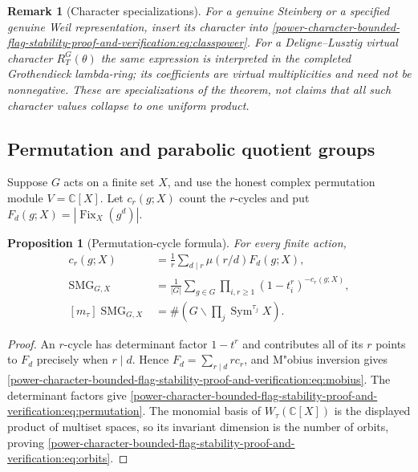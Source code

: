 \documentclass[10pt]{article}
\newcommand{\Sym}{\operatorname{Sym}}
\newcommand{\Fix}{\operatorname{Fix}}
\newcommand{\SMG}{\operatorname{SMG}}
\newcommand{\MGF}{\SMG}
\newcommand{\C}{\mathbb C}
\newtheorem{proposition}{Proposition}
\newtheorem{remark}{Remark}
\begin{document}
\begin{remark}[Character specializations]
For a genuine Steinberg or a specified genuine Weil representation, insert
its character into \eqref{power-character-bounded-flag-stability-proof-and-verification:eq:classpower}.  For a Deligne--Lusztig virtual
character $R_T^G(\theta)$ the same expression is interpreted in the completed
Grothendieck lambda-ring; its coefficients are virtual multiplicities and
need not be nonnegative.  These are specializations of the theorem, not
claims that all such character values collapse to one uniform product.
\end{remark}

\subsection{Permutation and parabolic quotient groups}

Suppose $G$ acts on a finite set $X$, and use the honest complex permutation
module $V=\C[X]$.  Let $c_r(g;X)$ count the $r$-cycles and put
$F_d(g;X)=|\Fix_X(g^d)|$.

\begin{proposition}[Permutation-cycle formula]\label{power-character-bounded-flag-stability-proof-and-verification:prop:permutation}
For every finite action,
\begin{align}
c_r(g;X)&=\frac1r\sum_{d\mid r}\mu(r/d)F_d(g;X),\label{power-character-bounded-flag-stability-proof-and-verification:eq:mobius}\\
\MGF_{G,X}&=\frac1{|G|}\sum_{g\in G}\prod_{i,r\ge1}
 (1-t_i^r)^{-c_r(g;X)},\label{power-character-bounded-flag-stability-proof-and-verification:eq:permutation}\\
[m_\tau]\MGF_{G,X}&=\#\left(G\backslash
 \prod_j\Sym^{\tau_j}X\right).\label{power-character-bounded-flag-stability-proof-and-verification:eq:orbits}
\end{align}
\end{proposition}

\begin{proof}
An $r$-cycle has determinant factor $1-t^r$ and contributes all of its $r$
points to $F_d$ precisely when $r\mid d$.  Hence
$F_d=\sum_{r\mid d}r c_r$, and M"obius inversion gives
\eqref{power-character-bounded-flag-stability-proof-and-verification:eq:mobius}.  The determinant factors give \eqref{power-character-bounded-flag-stability-proof-and-verification:eq:permutation}.
The monomial basis of $W_\tau(\C[X])$ is the displayed product of multiset
spaces, so its invariant dimension is the number of orbits, proving
\eqref{power-character-bounded-flag-stability-proof-and-verification:eq:orbits}.
\end{proof}
\end{document}
